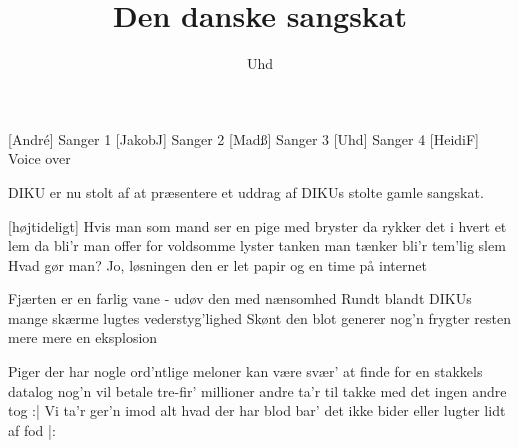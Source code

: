 \documentclass[a4paper,11pt]{article}
\title{Den danske sangskat}
\author{Uhd}
\begin{document}
\maketitle

\begin{roles}
[Andr\'e] Sanger 1
[JakobJ] Sanger 2
[Madß] Sanger 3
[Uhd] Sanger 4
[HeidiF] Voice over
\end{roles}

\begin{props}
\end{props}

  
\begin{song} DIKU er nu stolt af at præsentere et uddrag af DIKUs
  stolte gamle sangskat.


[højtideligt]
Hvis man som mand ser en pige med bryster
da rykker det i hvert et lem
da bli'r man offer for voldsomme lyster
tanken man tænker bli'r tem'lig slem
Hvad gør man? Jo, løsningen den er let
papir og en time på internet


Fjærten er en farlig vane
- udøv den med nænsomhed
Rundt blandt DIKUs mange skærme
lugtes vederstyg'lighed
Skønt den blot generer nog'n
frygter resten mere
mere en eksplosion


Piger der har nogle ord'ntlige meloner
kan være svær' at finde for en stakkels datalog
nog'n vil betale tre-fir' millioner
andre ta'r til takke med det ingen andre tog
:| Vi ta'r ger'n imod
alt hvad der har blod
bar' det ikke bider eller lugter lidt af fod |:

\end{song}
\end{document}
